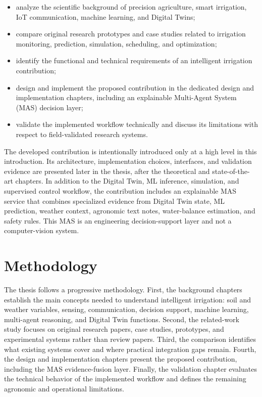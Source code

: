 \begin{itemize}
    \item analyze the scientific background of precision agriculture, smart irrigation, IoT communication, machine learning, and Digital Twins;
    \item compare original research prototypes and case studies related to irrigation monitoring, prediction, simulation, scheduling, and optimization;
    \item identify the functional and technical requirements of an intelligent irrigation contribution;
    \item design and implement the proposed contribution in the dedicated design and implementation chapters, including an explainable Multi-Agent System (MAS) decision layer;
    \item validate the implemented workflow technically and discuss its limitations with respect to field-validated research systems.
\end{itemize}

The developed contribution is intentionally introduced only at a high level in this introduction. Its architecture, implementation choices, interfaces, and validation evidence are presented later in the thesis, after the theoretical and state-of-the-art chapters. In addition to the Digital Twin, ML inference, simulation, and supervised control workflow, the contribution includes an explainable MAS service that combines specialized evidence from Digital Twin state, ML prediction, weather context, agronomic text notes, water-balance estimation, and safety rules. This MAS is an engineering decision-support layer and not a computer-vision system.

\section*{Methodology}

The thesis follows a progressive methodology. First, the background chapters establish the main concepts needed to understand intelligent irrigation: soil and weather variables, sensing, communication, decision support, machine learning, multi-agent reasoning, and Digital Twin functions. Second, the related-work study focuses on original research papers, case studies, prototypes, and experimental systems rather than review papers. Third, the comparison identifies what existing systems cover and where practical integration gaps remain. Fourth, the design and implementation chapters present the proposed contribution, including the MAS evidence-fusion layer. Finally, the validation chapter evaluates the technical behavior of the implemented workflow and defines the remaining agronomic and operational limitations.

